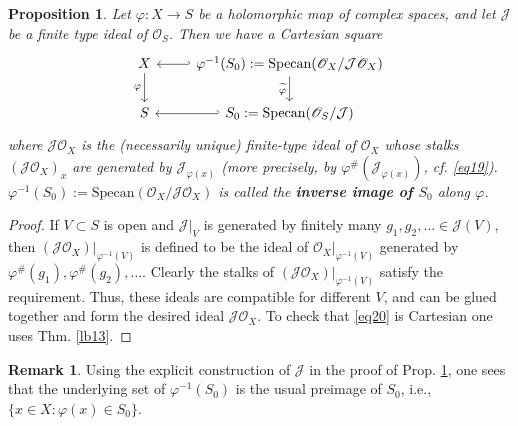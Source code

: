 \documentclass[12pt,b5paper,notitlepage]{report}
\theoremstyle{definition}
\newtheorem{rem}[df]{Remark}
\theoremstyle{plain}
\newtheorem{pp}[df]{Proposition}
\newcommand{\mc}{\mathcal}
\newcommand{\wtd}{\widetilde}
\newcommand{\scr}{\mathscr}
\newcommand{\Specan}{\mathrm{Specan}}
\numberwithin{equation}{section}
\begin{document}
\begin{pp}\label{lb39}
Let $\varphi:X\rightarrow S$ be a holomorphic map of complex spaces, and let $\mc J$ be a finite type ideal of $\scr O_S$. Then we have a Cartesian square
\begin{equation}\label{eq20}
\begin{tikzcd}
X \arrow[d,"\varphi"'] & \varphi^{-1}(S_0):=\Specan(\scr O_X/\mc J\scr O_X) \arrow[d,"\wtd\varphi"'] \arrow[l, hook'] \\
S           & S_0:=\Specan(\scr O_S/\mc J) \arrow[l, hook']          
\end{tikzcd}
\end{equation}
where $\mc J\scr O_X$ is the (necessarily unique) finite-type ideal of $\scr O_X$ whose stalks $(\mc J\scr O_X)_x$ are generated by $\mc J_{\varphi(x)}$ (more precisely, by $\varphi^\#(\mc J_{\varphi(x)})$, cf. \eqref{eq19}). $\varphi^{-1}(S_0):=\Specan(\scr O_X/\mc J\scr O_X)$ is called the \textbf{inverse image of $S_0$} along $\varphi$. 
\end{pp}



\begin{proof}
If $V\subset S$ is open and $\mc J|_V$ is generated by finitely many $g_1,g_2,\dots\in\mc J(V)$, then $(\mc J\scr O_X)|_{\varphi^{-1}(V)}$ is defined to be the ideal of $\scr O_X|_{\varphi^{-1}(V)}$ generated by $\varphi^\#(g_1),\varphi^\#(g_2),\dots$. Clearly the stalks of $(\mc J\scr O_X)|_{\varphi^{-1}(V)}$ satisfy the requirement. Thus, these ideals are compatible for different $V$, and can be glued together and form the desired ideal  $\mc J\scr O_X$.   To check that \eqref{eq20} is Cartesian one uses Thm. \ref{lb13}.
\end{proof}


\begin{rem}
Using the explicit construction of $\mc J$ in the proof of Prop. \ref{lb39}, one sees that the underlying set of $\varphi^{-1}(S_0)$ is the usual preimage of $S_0$, i.e., $\{x\in X:\varphi(x)\in S_0\}$.
\end{rem}
\end{document}
